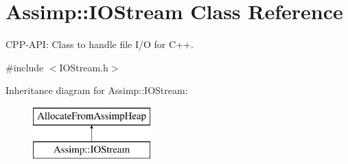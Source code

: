 \hypertarget{class_assimp_1_1_i_o_stream}{\section{Assimp\-:\-:I\-O\-Stream Class Reference}
\label{class_assimp_1_1_i_o_stream}
}


C\-P\-P-\/\-A\-P\-I\-: Class to handle file I/\-O for C++.  




{\ttfamily \#include $<$I\-O\-Stream.\-h$>$}

Inheritance diagram for Assimp\-:\-:I\-O\-Stream\-:\begin{figure}[H]
\begin{center}
\leavevmode
\includegraphics[height=2.000000cm]{class_assimp_1_1_i_o_stream}
\end{center}
\end{figure}
